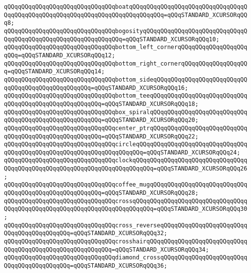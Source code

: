 \verb|qQQqqQQqqQQqqQQqqQQqqQQqqQQqqQQqboatqQQqqQQqqQQqqQQqqQQqqQQqqQQqqQQqqQQqqQQqqQQqqQQqqQQqqQQqqQQqqQQqqQQqqQQqqQQqqQQq=qQQqSTANDARD_XCURSORqQQq8;|\newline
\verb|qQQqqQQqqQQqqQQqqQQqqQQqqQQqqQQqbogosityqQQqqQQqqQQqqQQqqQQqqQQqqQQqqQQqqQQqqQQqqQQqqQQqqQQqqQQqqQQqqQQq=qQQqSTANDARD_XCURSORqQQq10;|\newline
\verb|qQQqqQQqqQQqqQQqqQQqqQQqqQQqqQQqbottom_left_cornerqQQqqQQqqQQqqQQqqQQqqQQq=qQQqSTANDARD_XCURSORqQQq12;|\newline
\verb|qQQqqQQqqQQqqQQqqQQqqQQqqQQqqQQqbottom_right_cornerqQQqqQQqqQQqqQQqqQQq=qQQqSTANDARD_XCURSORqQQq14;|\newline
\verb|qQQqqQQqqQQqqQQqqQQqqQQqqQQqqQQqbottom_sideqQQqqQQqqQQqqQQqqQQqqQQqqQQqqQQqqQQqqQQqqQQqqQQqqQQq=qQQqSTANDARD_XCURSORqQQq16;|\newline
\verb|qQQqqQQqqQQqqQQqqQQqqQQqqQQqqQQqbottom_teeqQQqqQQqqQQqqQQqqQQqqQQqqQQqqQQqqQQqqQQqqQQqqQQqqQQqqQQq=qQQqSTANDARD_XCURSORqQQq18;|\newline
\verb|qQQqqQQqqQQqqQQqqQQqqQQqqQQqqQQqbox_spiralqQQqqQQqqQQqqQQqqQQqqQQqqQQqqQQqqQQqqQQqqQQqqQQqqQQqqQQq=qQQqSTANDARD_XCURSORqQQq20;|\newline
\verb|qQQqqQQqqQQqqQQqqQQqqQQqqQQqqQQqcenter_ptrqQQqqQQqqQQqqQQqqQQqqQQqqQQqqQQqqQQqqQQqqQQqqQQqqQQqqQQq=qQQqSTANDARD_XCURSORqQQq22;|\newline
\verb|qQQqqQQqqQQqqQQqqQQqqQQqqQQqqQQqcircleqQQqqQQqqQQqqQQqqQQqqQQqqQQqqQQqqQQqqQQqqQQqqQQqqQQqqQQqqQQqqQQqqQQqqQQq=qQQqSTANDARD_XCURSORqQQq24;|\newline
\verb|qQQqqQQqqQQqqQQqqQQqqQQqqQQqqQQqclockqQQqqQQqqQQqqQQqqQQqqQQqqQQqqQQqqQQqqQQqqQQqqQQqqQQqqQQqqQQqqQQqqQQqqQQqqQQq=qQQqSTANDARD_XCURSORqQQq26;|\newline
\verb|qQQqqQQqqQQqqQQqqQQqqQQqqQQqqQQqcoffee_mugqQQqqQQqqQQqqQQqqQQqqQQqqQQqqQQqqQQqqQQqqQQqqQQqqQQqqQQq=qQQqSTANDARD_XCURSORqQQq28;|\newline
\verb|qQQqqQQqqQQqqQQqqQQqqQQqqQQqqQQqcrossqQQqqQQqqQQqqQQqqQQqqQQqqQQqqQQqqQQqqQQqqQQqqQQqqQQqqQQqqQQqqQQqqQQqqQQqqQQq=qQQqSTANDARD_XCURSORqQQq30;|\newline
\verb|qQQqqQQqqQQqqQQqqQQqqQQqqQQqqQQqcross_reverseqQQqqQQqqQQqqQQqqQQqqQQqqQQqqQQqqQQqqQQqqQQq=qQQqSTANDARD_XCURSORqQQq32;|\newline
\verb|qQQqqQQqqQQqqQQqqQQqqQQqqQQqqQQqcrosshairqQQqqQQqqQQqqQQqqQQqqQQqqQQqqQQqqQQqqQQqqQQqqQQqqQQqqQQqqQQq=qQQqSTANDARD_XCURSORqQQq34;|\newline
\verb|qQQqqQQqqQQqqQQqqQQqqQQqqQQqqQQqdiamond_crossqQQqqQQqqQQqqQQqqQQqqQQqqQQqqQQqqQQqqQQqqQQq=qQQqSTANDARD_XCURSORqQQq36;|\newline
